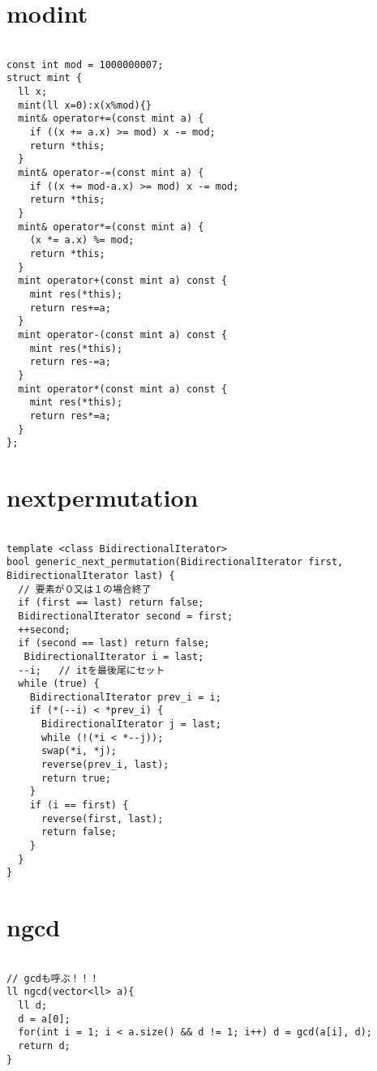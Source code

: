 \documentclass[a4j,titlepage]{jarticle} %
\begin{document}
\color{white}
\section{modint}
\color{black}
\begin{lstlisting}[caption=modint]

const int mod = 1000000007;
struct mint {
  ll x;
  mint(ll x=0):x(x%mod){}
  mint& operator+=(const mint a) {
    if ((x += a.x) >= mod) x -= mod;
    return *this;
  }
  mint& operator-=(const mint a) {
    if ((x += mod-a.x) >= mod) x -= mod;
    return *this;
  }
  mint& operator*=(const mint a) {
    (x *= a.x) %= mod;
    return *this;
  }
  mint operator+(const mint a) const {
    mint res(*this);
    return res+=a;
  }
  mint operator-(const mint a) const {
    mint res(*this);
    return res-=a;
  }
  mint operator*(const mint a) const {
    mint res(*this);
    return res*=a;
  }
};

\end{lstlisting}

\color{white}
\section{nextpermutation}
\color{black}
\begin{lstlisting}[caption=nextpermutation]

template <class BidirectionalIterator>
bool generic_next_permutation(BidirectionalIterator first, BidirectionalIterator last) {
  // 要素が０又は１の場合終了
  if (first == last) return false;
  BidirectionalIterator second = first;
  ++second;
  if (second == last) return false;
   BidirectionalIterator i = last;
  --i;   // itを最後尾にセット
  while (true) {
    BidirectionalIterator prev_i = i;
    if (*(--i) < *prev_i) {
      BidirectionalIterator j = last;
      while (!(*i < *--j));
      swap(*i, *j);
      reverse(prev_i, last);
      return true;
    }
    if (i == first) {
      reverse(first, last);
      return false;
    }
  }
}

\end{lstlisting}

\color{white}
\section{ngcd}
\color{black}
\begin{lstlisting}[caption=ngcd]

// gcdも呼ぶ！！！
ll ngcd(vector<ll> a){
  ll d;
  d = a[0];
  for(int i = 1; i < a.size() && d != 1; i++) d = gcd(a[i], d);
  return d;
}

\end{lstlisting}
\end{document}
